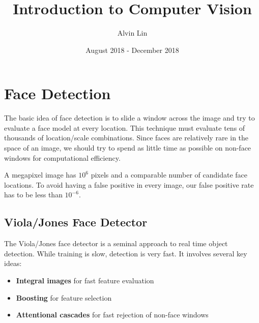 \documentclass{math}
\title{Introduction to Computer Vision}
\author{Alvin Lin}
\date{August 2018 - December 2018}
\begin{document}
\maketitle

\section*{Face Detection}
The basic idea of face detection is to slide a window across the image and try
to evaluate a face model at every location. This technique must evaluate tens
of thousands of location/scale combinations. Since faces are relatively rare
in the space of an image, we should try to spend as little time as possible
on non-face windows for computational efficiency. \par
A megapixel image has \( 10^6 \) pixels and a comparable number of candidate
face locations. To avoid having a false positive in every image, our false
positive rate has to be less than \( 10^{-6} \).

\subsection*{Viola/Jones Face Detector}
The Viola/Jones face detector is a seminal approach to real time object
detection. While training is slow, detection is very fast. It involves
several key ideas:
\begin{itemize}
  \item \textbf{Integral images} for fast feature evaluation
  \item \textbf{Boosting} for feature selection
  \item \textbf{Attentional cascades} for fast rejection of non-face windows
\end{itemize}
\end{document}

